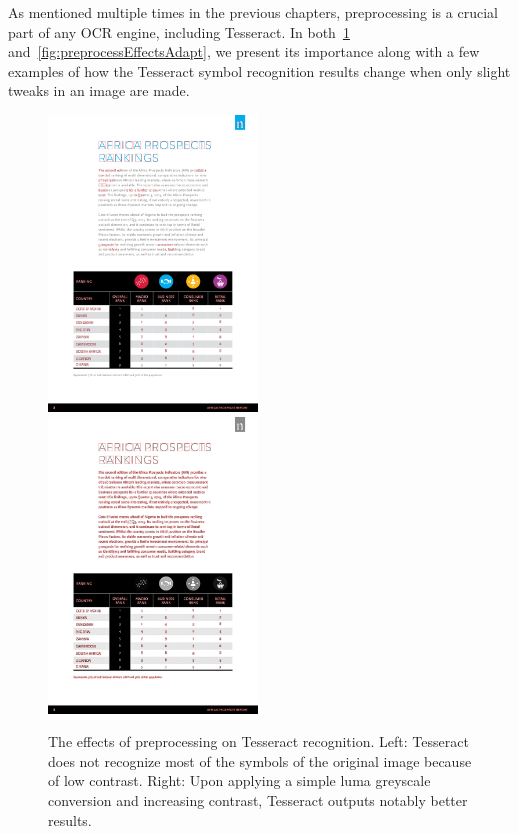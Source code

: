 As mentioned multiple times in the previous chapters, preprocessing is a crucial part of any OCR engine, including Tesseract. In both~\cref{fig:preprocessEffectsGS} and~\cref{fig:preprocessEffectsAdapt}, we present its importance along with a few examples of how the Tesseract symbol recognition results change when only slight tweaks in an image are made.

\begin{figure}[t]
\centering

\includegraphics[width=15em]{img/results/im1_noPreproc.png}
\includegraphics[width=15em]{img/results/im1_Preproc.png}

\caption{The effects of preprocessing on Tesseract recognition. Left: Tesseract does not recognize most of the symbols of the original image because of low contrast. Right: Upon applying a simple luma greyscale conversion and increasing contrast, Tesseract outputs notably better results.}
\label{fig:preprocessEffectsGS}
\end{figure}

